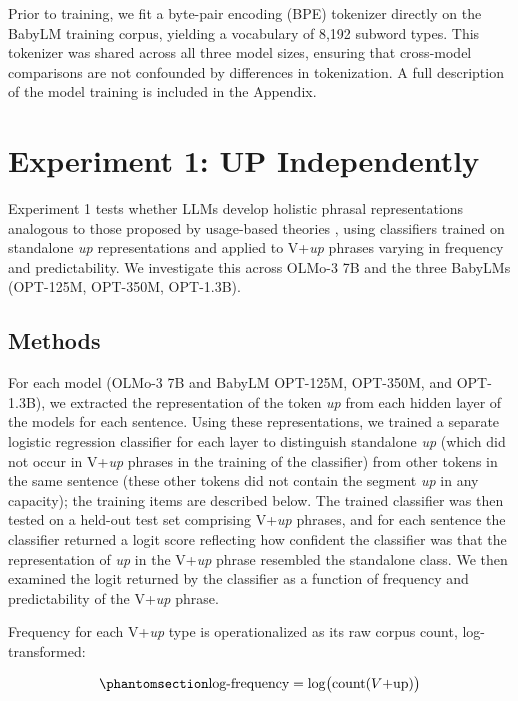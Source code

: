 \documentclass[11pt]{article}
\begin{document}
Prior to training, we fit a byte-pair encoding (BPE) tokenizer directly
on the BabyLM training corpus, yielding a vocabulary of 8,192 subword
types. This tokenizer was shared across all three model sizes, ensuring
that cross-model comparisons are not confounded by differences in
tokenization. A full description of the model training is included in
the Appendix.

\section{Experiment 1: UP
Independently}\label{experiment-1-up-independently}

Experiment 1 tests whether LLMs develop holistic phrasal representations
analogous to those proposed by usage-based theories
\citep[e.g.,][]{kapatsinski2010frequencyuseleads, houghton2025multiwordrepresentationsminds},
using classifiers trained on standalone \emph{up} representations and
applied to V+\emph{up} phrases varying in frequency and predictability.
We investigate this across OLMo-3 7B and the three BabyLMs (OPT-125M,
OPT-350M, OPT-1.3B).

\subsection{Methods}\label{methods}

For each model (OLMo-3 7B and BabyLM OPT-125M, OPT-350M, and OPT-1.3B),
we extracted the representation of the token \emph{up} from each hidden
layer of the models for each sentence. Using these representations, we
trained a separate logistic regression classifier for each layer to
distinguish standalone \emph{up} (which did not occur in V+\emph{up}
phrases in the training of the classifier) from other tokens in the same
sentence (these other tokens did not contain the segment \emph{up} in
any capacity); the training items are described below. The trained
classifier was then tested on a held-out test set comprising V+\emph{up}
phrases, and for each sentence the classifier returned a logit score
reflecting how confident the classifier was that the representation of
\emph{up} in the V+\emph{up} phrase resembled the standalone class. We
then examined the logit returned by the classifier as a function of
frequency and predictability of the V+\emph{up} phrase.

Frequency for each V+\emph{up} type is operationalized as its raw corpus
count, log-transformed:

\begin{equation}\phantomsection\label{eq-log-freq}{\text{log-frequency} = \log\bigl(\text{count}(V\text{+up})\bigr)}\end{equation}
\end{document}
